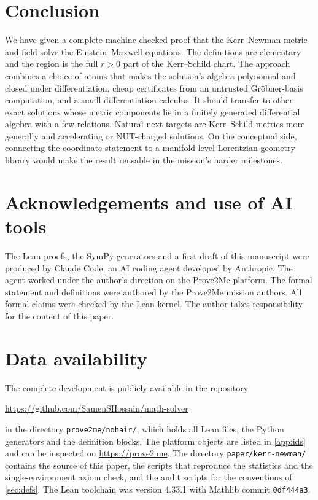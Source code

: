 \documentclass[11pt]{article}
\theoremstyle{definition}
\theoremstyle{remark}
\begin{document}
\section{Conclusion}\label{sec:conclusion}

We have given a complete machine-checked proof that the Kerr--Newman metric and field solve the Einstein--Maxwell equations.
The definitions are elementary and the region is the full $r>0$ part of the Kerr--Schild chart.
The approach combines a choice of atoms that makes the solution's algebra polynomial and closed under differentiation, cheap certificates from an untrusted Gr\"obner-basis computation, and a small differentiation calculus.
It should transfer to other exact solutions whose metric components lie in a finitely generated differential algebra with a few relations.
Natural next targets are Kerr--Schild metrics more generally and accelerating or NUT-charged solutions.
On the conceptual side, connecting the coordinate statement to a manifold-level Lorentzian geometry library would make the result reusable in the mission's harder milestones.

\section*{Acknowledgements and use of AI tools}
The Lean proofs, the SymPy generators and a first draft of this manuscript were produced by Claude Code, an AI coding agent developed by Anthropic.
The agent worked under the author's direction on the Prove2Me platform.
The formal statement and definitions were authored by the Prove2Me mission authors.
All formal claims were checked by the Lean kernel.
The author takes responsibility for the content of this paper.

\section*{Data availability}
The complete development is publicly available in the repository
\begin{center}\url{https://github.com/SamenSHossain/math-solver}\end{center}
in the directory \texttt{prove2me/nohair/}, which holds all Lean files, the Python generators and the definition blocks.
The platform objects are listed in \cref{app:ids} and can be inspected on \url{https://prove2.me}.
The directory \texttt{paper/kerr-newman/} contains the source of this paper, the scripts that reproduce the statistics and the single-environment axiom check, and the audit scripts for the conventions of \cref{sec:defs}. The Lean toolchain was version 4.33.1 with Mathlib commit \texttt{0df444a3}.
\end{document}
